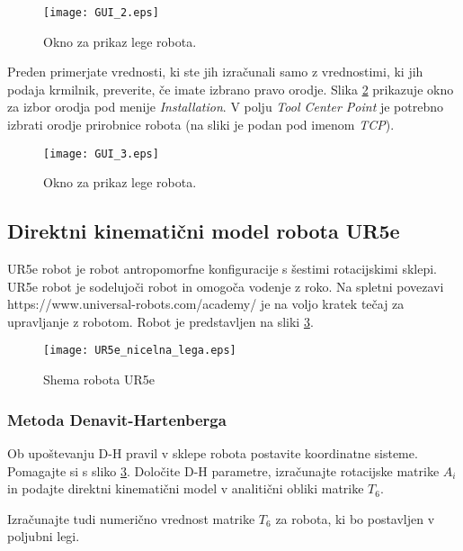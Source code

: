 \begin{figure}[h]
	\centering
	\texttt{[image: GUI\_2.eps]}
	\caption{\label{GUI_UR53_2} Okno za prikaz lege robota.}
\end{figure}

Preden primerjate vrednosti, ki ste jih izračunali samo z vrednostimi, ki jih podaja krmilnik, preverite, če imate izbrano pravo orodje. Slika \ref{GUI_UR53_3} prikazuje okno za izbor orodja pod menije \emph{Installation}. V polju \emph{Tool Center Point} je potrebno izbrati orodje prirobnice robota (na sliki je podan pod imenom \emph{TCP}).

\begin{figure}[h]
	\centering
	\texttt{[image: GUI\_3.eps]}
	\caption{\label{GUI_UR53_3} Okno za prikaz lege robota.}
\end{figure}

\subsection{Direktni kinematični model robota UR5e}

UR5e robot je robot antropomorfne konfiguracije s šestimi rotacijskimi sklepi. UR5e robot je sodelujoči robot in omogoča vodenje z roko. Na spletni povezavi https://www.universal-robots.com/academy/ je na voljo kratek tečaj za upravljanje z robotom. Robot je predstavljen na sliki \ref{fShemaUR5e}.

\begin{figure}[h]
    \centering
    \texttt{[image: UR5e\_nicelna\_lega.eps]}
    \vspace{-0.3cm}
    \caption{Shema robota UR5e}
    \label{fShemaUR5e}
\end{figure}

\subsubsection{Metoda Denavit-Hartenberga}
Ob upoštevanju D-H pravil v sklepe robota postavite koordinatne sisteme.
Pomagajte si s sliko \ref{fShemaUR5e}. Določite D-H parametre, izračunajte
rotacijske matrike $A_i$ in podajte direktni kinematični model v analitični
obliki matrike $T_6$.

Izračunajte tudi numerično vrednost matrike $T_6$ za robota, ki bo postavljen v poljubni legi.

